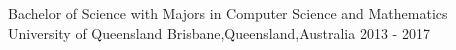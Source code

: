 


\begin{cventries}


\cventry
{Bachelor of Science with Majors in Computer Science and Mathematics} %
{University of Queensland} %
{Brisbane,Queensland,Australia} %
{2013 - 2017} %
{ %
\begin{cvitems}
\end{cvitems}
}


\end{cventries}